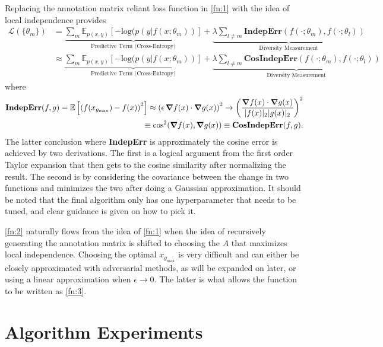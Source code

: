 \documentclass[twoside,11pt]{article}
\begin{document}
Replacing the annotation matrix reliant loss function in \cref{fn:1} with the idea of local independence provides 
\begin{align}
\mathcal{L}(\{ \theta_m \}) & = \underbrace{\sum_m \mathbb{E}_{p(x,y)} \left[ - \text{log}(p(y|f(x; \theta_m))\right]}_\text{Predictive Term (Cross-Entropy)} + \underbrace{\lambda\sum_{l\neq m}\textbf{IndepErr}\left(f(\cdot ;\theta_m), f(\cdot ; \theta_l)\right)}_\text{Diversity Measurement} \label{fn:2}\\
&\approx \underbrace{\sum_m \mathbb{E}_{p(x,y)} \left[ - \text{log}(p(y|f(x; \theta_m))\right]}_\text{Predictive Term (Cross-Entropy)} + \underbrace{\lambda\sum_{l\neq m}\textbf{CosIndepErr}\left(f(\cdot ;\theta_m), f(\cdot ; \theta_l)\right)}_\text{Diversity Measurement} \label{fn:3}
\end{align}
where
\begin{align*}
\textbf{IndepErr}(f,g) = \mathbb{E}\left[\left(f(x_{g_\text{max}}) - f(x)\right)^2\right] \approx \left(\epsilon \, \grad{f(x)} \cdot \grad{g(x)}\right)^2 \rightarrow \left(\frac{\grad{f(x)} \cdot \grad{g(x)}}{|f(x)|_2 |g(x)|_2}\right)^2 \\
\equiv \cos[2](\grad{f(x)}, \grad{g(x)}) \equiv \textbf{CosIndepErr}(f,g).
\end{align*}
The latter conclusion where \textbf{IndepErr} is approximately the cosine error is achieved by two derivations. The first is a logical argument from the first order Taylor expansion that then gets to the cosine similarity after normalizing the result. The second is by considering the covariance between the change in two functions and minimizes the two after doing a Gaussian approximation. It should be noted that the final algorithm only has one hyperparameter that needs to be tuned, and clear guidance is given on how to pick it.

\cref{fn:2} naturally flows from the idea of \cref{fn:1} when the idea of recursively generating the annotation matrix is shifted to choosing the $A$ that maximizes local independence. Choosing the optimal $x_{g_\text{max}}$ is very difficult and can either be closely approximated with adversarial methods, as will be expanded on later, or using a linear approximation when $\epsilon \rightarrow 0$. The latter is what allows the function to be written as \cref{fn:3}.


\section{Algorithm Experiments}
\end{document}
